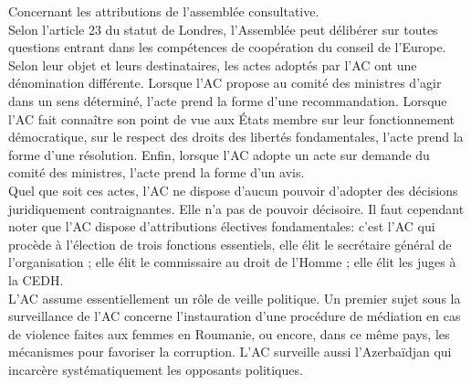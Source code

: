 \documentclass[10pt, a4paper, openany]{book}
\begin{document}
Concernant les attributions de l'assemblée consultative. \\
Selon l'article 23 du statut de Londres, l'Assemblée peut délibérer sur toutes questions entrant dans les compétences de coopération du conseil de l'Europe. Selon leur objet et leurs destinataires, les actes adoptés par l'AC ont une dénomination différente. Lorsque l'AC propose au comité des ministres d'agir dans un sens déterminé, l'acte prend la forme d'une recommandation. Lorsque l'AC fait connaître son point de vue aux États membre sur leur fonctionnement démocratique, sur le respect des droits des libertés fondamentales, l'acte prend la forme d'une résolution. Enfin, lorsque l'AC adopte un acte sur demande du comité des ministres, l'acte prend la forme d'un avis. \\
Quel que soit ces actes, l'AC ne dispose d'aucun pouvoir d'adopter des décisions juridiquement contraignantes. Elle n'a pas de pouvoir décisoire. Il faut cependant noter que l'AC dispose d'attributions électives fondamentales: c'est l'AC qui procède à l'élection de trois fonctions essentiels, elle élit le secrétaire général de l'organisation ; elle élit le commissaire au droit de l'Homme ; elle élit les juges à la CEDH. \\
L'AC assume essentiellement un rôle de veille politique. Un premier sujet sous la surveillance de l'AC concerne l'instauration d'une procédure de médiation en cas de violence faites aux femmes en Roumanie, ou encore, dans ce même pays, les mécanismes pour favoriser la corruption. L'AC surveille aussi l'Azerbaïdjan qui incarcère systématiquement les opposants politiques.
\end{document}
